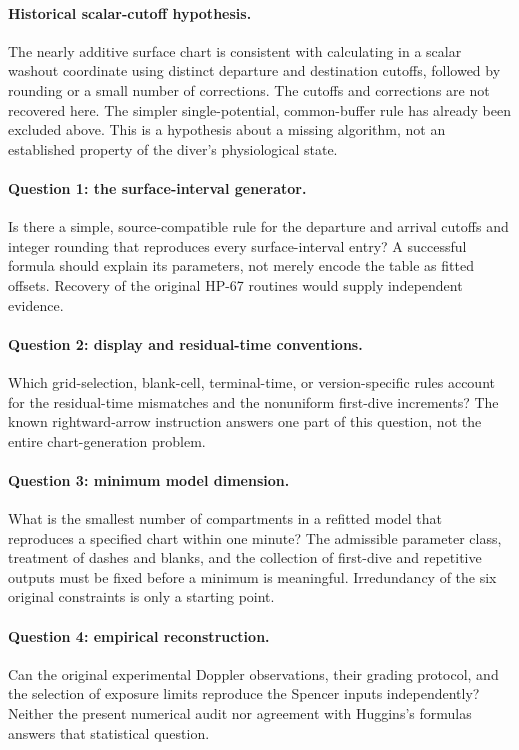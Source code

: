 \documentclass[11pt,letterpaper]{article}
\begin{document}
\paragraph{Historical scalar-cutoff hypothesis.}
The nearly additive surface chart is consistent with calculating in a scalar washout coordinate using distinct departure and destination cutoffs, followed by rounding or a small number of corrections. The cutoffs and corrections are not recovered here. The simpler single-potential, common-buffer rule has already been excluded above. This is a hypothesis about a missing algorithm, not an established property of the diver's physiological state.

\paragraph{Question 1: the surface-interval generator.}
Is there a simple, source-compatible rule for the departure and arrival cutoffs and integer rounding that reproduces every surface-interval entry? A successful formula should explain its parameters, not merely encode the table as fitted offsets. Recovery of the original HP-67 routines would supply independent evidence.

\paragraph{Question 2: display and residual-time conventions.}
Which grid-selection, blank-cell, terminal-time, or version-specific rules account for the residual-time mismatches and the nonuniform first-dive increments? The known rightward-arrow instruction answers one part of this question, not the entire chart-generation problem.

\paragraph{Question 3: minimum model dimension.}
What is the smallest number of compartments in a refitted model that reproduces a specified chart within one minute? The admissible parameter class, treatment of dashes and blanks, and the collection of first-dive and repetitive outputs must be fixed before a minimum is meaningful. Irredundancy of the six original constraints is only a starting point.

\paragraph{Question 4: empirical reconstruction.}
Can the original experimental Doppler observations, their grading protocol, and the selection of exposure limits reproduce the Spencer inputs independently? Neither the present numerical audit nor agreement with Huggins's formulas answers that statistical question.
\end{document}
